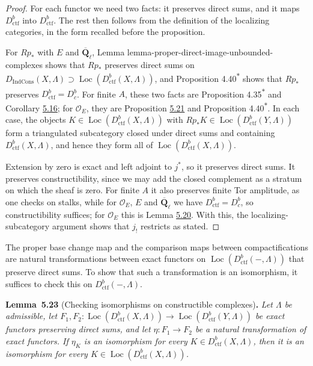 \documentclass[11pt]{article}
\newenvironment{bpstatement}[2]{\par\addvspace{0.6\baselineskip}\noindent\textbf{#1}#2\textbf{.}\enspace\ignorespaces}
  {\par\addvspace{0.4\baselineskip}}
\newenvironment{bpstatementit}[2]{\begin{bpstatement}{#1}{#2}\itshape\ignorespaces}{\end{bpstatement}}
\newcommand{\bpout}[1]{#1\textsuperscript{\hyperlink{bp-outside}{\ensuremath{\ast}}}}
\providecommand{\Dbc}{}\renewcommand{\Dbc}{D^b_c}
\providecommand{\Dic}{}\renewcommand{\Dic}{D_{\IndCons}}
\providecommand{\IndCons}{}\renewcommand{\IndCons}{\operatorname{IndCons}}
\providecommand{\Loc}{}\renewcommand{\Loc}{\operatorname{Loc}}
\begin{document}
\begin{proof}[{Proof}]\label{bp77}%
For each functor we need two facts: it preserves direct sums, and it maps \(D^b_{\mathrm{ctf}}\) into \(D^b_{\mathrm{ctf}}\). The rest then follows from the definition of the localizing categories, in the form recalled before the proposition.

For \(Rp_*\) with \(E\) and \(\overline{\mathbf Q}_\ell\), Lemma lemma-proper-direct-image-unbounded-complexes shows that \(Rp_*\) preserves direct sums on \(\Dic(X,\Lambda)\supset\Loc(D^b_{\mathrm{ctf}}(X,\Lambda))\), and Proposition \bpout{4.40} shows that \(Rp_*\) preserves \(D^b_{\mathrm{ctf}}=\Dbc\). For finite \(A\), these two facts are Proposition \bpout{4.35} and Corollary \hyperref[bp51]{5.16}; for \(\mathcal O_E\), they are Proposition \hyperref[bp71]{5.21} and Proposition \bpout{4.40}. In each case, the objects \(K\in\Loc(D^b_{\mathrm{ctf}}(X,\Lambda))\) with \(Rp_*K\in\Loc(D^b_{\mathrm{ctf}}(Y,\Lambda))\) form a triangulated subcategory closed under direct sums and containing \(D^b_{\mathrm{ctf}}(X,\Lambda)\), and hence they form all of \(\Loc(D^b_{\mathrm{ctf}}(X,\Lambda))\).

Extension by zero is exact and left adjoint to \(j^*\), so it preserves direct sums. It preserves constructibility, since we may add the closed complement as a stratum on which the sheaf is zero. For finite \(A\) it also preserves finite Tor amplitude, as one checks on stalks, while for \(\mathcal O_E\), \(E\) and \(\overline{\mathbf Q}_\ell\) we have \(D^b_{\mathrm{ctf}}=\Dbc\), so constructibility suffices; for \(\mathcal O_E\) this is Lemma \hyperref[bp68]{5.20}. With this, the localizing-subcategory argument shows that \(j_!\) restricts as stated.
\end{proof}

\label{bp78}%
The proper base change map and the comparison maps between compactifications are natural transformations between exact functors on \(\Loc(D^b_{\mathrm{ctf}}(-,\Lambda))\) that preserve direct sums. To show that such a transformation is an isomorphism, it suffices to check this on \(D^b_{\mathrm{ctf}}(-,\Lambda)\).

\label{bp79}%
\begin{bpstatementit}{Lemma~5.23}{ (Checking isomorphisms on constructible complexes)}
Let \(\Lambda\) be admissible, let \(F_1,F_2:\Loc(D^b_{\mathrm{ctf}}(X,\Lambda))\to\Loc(D^b_{\mathrm{ctf}}(Y,\Lambda))\) be exact functors preserving direct sums, and let \(\eta:F_1\to F_2\) be a natural transformation of exact functors. If \(\eta_K\) is an isomorphism for every \(K\in D^b_{\mathrm{ctf}}(X,\Lambda)\), then it is an isomorphism for every \(K\in\Loc(D^b_{\mathrm{ctf}}(X,\Lambda))\).
\end{bpstatementit}
\end{document}
